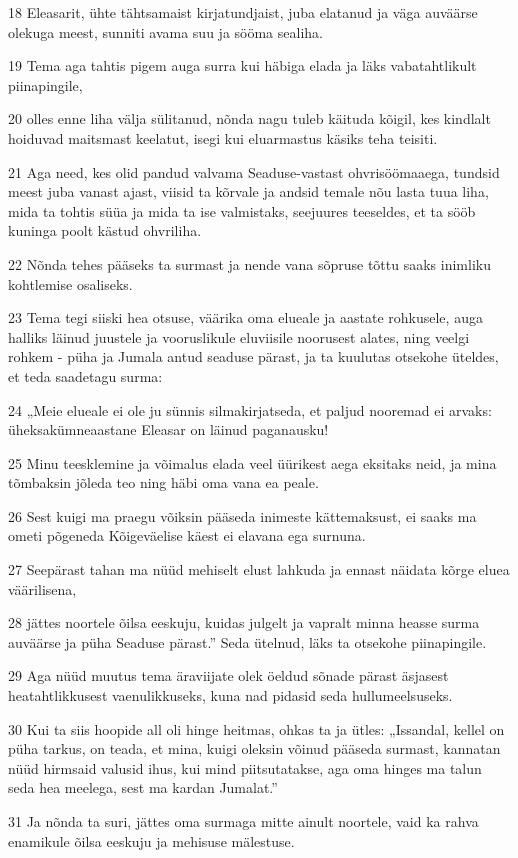 \par 18 Eleasarit, ühte tähtsamaist kirjatundjaist, juba elatanud ja väga auväärse olekuga meest, sunniti avama suu ja sööma sealiha.
\par 19 Tema aga tahtis pigem auga surra kui häbiga elada ja läks vabatahtlikult piinapingile,
\par 20 olles enne liha välja sülitanud, nõnda nagu tuleb käituda kõigil, kes kindlalt hoiduvad maitsmast keelatut, isegi kui eluarmastus käsiks teha teisiti.
\par 21 Aga need, kes olid pandud valvama Seaduse-vastast ohvrisöömaaega, tundsid meest juba vanast ajast, viisid ta kõrvale ja andsid temale nõu lasta tuua liha, mida ta tohtis süüa ja mida ta ise valmistaks, seejuures teeseldes, et ta sööb kuninga poolt kästud ohvriliha.
\par 22 Nõnda tehes pääseks ta surmast ja nende vana sõpruse tõttu saaks inimliku kohtlemise osaliseks.
\par 23 Tema tegi siiski hea otsuse, väärika oma elueale ja aastate rohkusele, auga halliks läinud juustele ja vooruslikule eluviisile noorusest alates, ning veelgi rohkem - püha ja Jumala antud seaduse pärast, ja ta kuulutas otsekohe üteldes, et teda saadetagu surma:
\par 24 „Meie elueale ei ole ju sünnis silmakirjatseda, et paljud nooremad ei arvaks: üheksakümneaastane Eleasar on läinud paganausku!
\par 25 Minu teesklemine ja võimalus elada veel üürikest aega eksitaks neid, ja mina tõmbaksin jõleda teo ning häbi oma vana ea peale.
\par 26 Sest kuigi ma praegu võiksin pääseda inimeste kättemaksust, ei saaks ma ometi põgeneda Kõigeväelise käest ei elavana ega surnuna.
\par 27 Seepärast tahan ma nüüd mehiselt elust lahkuda ja ennast näidata kõrge eluea väärilisena,
\par 28 jättes noortele õilsa eeskuju, kuidas julgelt ja vapralt minna heasse surma auväärse ja püha Seaduse pärast.” Seda ütelnud, läks ta otsekohe piinapingile.
\par 29 Aga nüüd muutus tema äraviijate olek öeldud sõnade pärast äsjasest heatahtlikkusest vaenulikkuseks, kuna nad pidasid seda hullumeelsuseks.
\par 30 Kui ta siis hoopide all oli hinge heitmas, ohkas ta ja ütles: „Issandal, kellel on püha tarkus, on teada, et mina, kuigi oleksin võinud pääseda surmast, kannatan nüüd hirmsaid valusid ihus, kui mind piitsutatakse, aga oma hinges ma talun seda hea meelega, sest ma kardan Jumalat.”
\par 31 Ja nõnda ta suri, jättes oma surmaga mitte ainult noortele, vaid ka rahva enamikule õilsa eeskuju ja mehisuse mälestuse.




